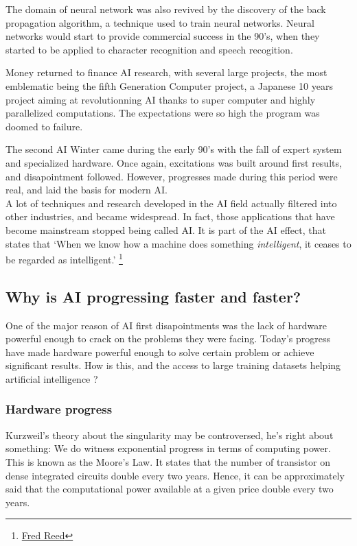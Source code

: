 \documentclass[12pt]{article}
\begin{document}
The domain of neural network was also revived by the discovery of the back
propagation algorithm, a technique used to train neural networks. Neural
networks would start to provide commercial success in the 90's, when they
started to be  applied to character recognition and speech recogition.

Money returned to finance AI research, with several large projects, the most
emblematic being the fifth Generation Computer project, a Japanese 10 years
project aiming at revolutionning AI thanks to super computer and highly
parallelized computations. The expectations were so high the program was doomed
to failure.

The second AI Winter came during the early 90's with the fall of expert system
and  specialized hardware. Once again, excitations was built around first
results, and  disapointment followed. However, progresses made during this
period were real,  and laid the basis for modern AI.\\

A lot of techniques and research developed in the AI field actually filtered
into  other industries, and became widespread. In fact, those applications that
have become  mainstream stopped being called AI. It is part of the AI effect,
that states that \lq When we know how a machine does something {\em
intelligent}, it ceases to be regarded as intelligent.\rq
\footnote{\href{http://www.washingtontimes.com/news/2006/apr/13/20060413-105217-7645r/}
{Fred Reed}}

\pagebreak

\subsection{Why is AI progressing faster and faster?}

One of the major reason of AI first disapointments was the lack of hardware
powerful  enough to crack on the problems they were facing. Today's progress
have made hardware powerful enough to solve certain problem or achieve
significant results. How is this, and the  access to large training datasets
helping artificial intelligence ?

\subsubsection{Hardware progress}

Kurzweil's theory about the singularity may be controversed, he's right about
something: We do witness exponential progress in terms of computing power. This
is known as the Moore's Law. It states that the number of transistor on dense
integrated circuits double every two years. Hence, it can be approximately said
that the computational power available at a given price double every two years.
\end{document}
